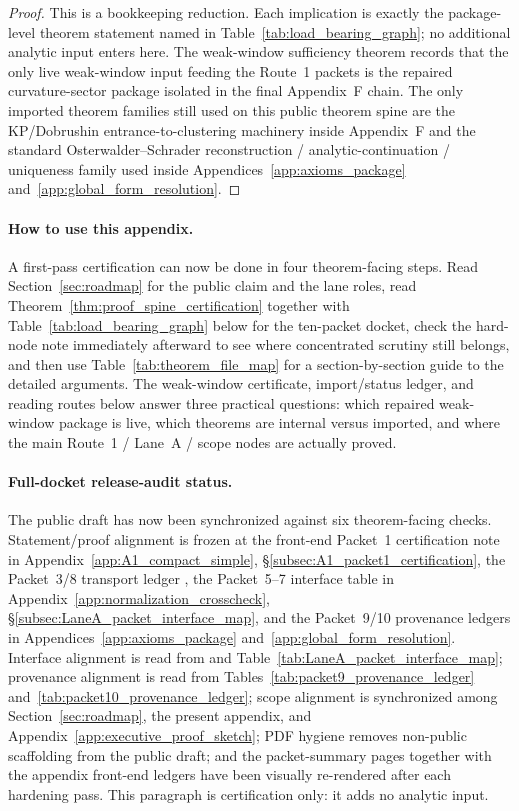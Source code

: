 \begin{proof}
This is a bookkeeping reduction.
Each implication is exactly the package-level theorem statement named in Table~\ref{tab:load_bearing_graph}; no additional analytic input enters here.
The weak-window sufficiency theorem  records that the only live weak-window input feeding the Route~1 packets is the repaired curvature-sector package isolated in the final Appendix~F chain.
The only imported theorem families still used on this public theorem spine are the KP/Dobrushin entrance-to-clustering machinery inside Appendix~F and the standard Osterwalder--Schrader reconstruction / analytic-continuation / uniqueness family used inside Appendices~\ref{app:axioms_package} and~\ref{app:global_form_resolution}.
\end{proof}

\paragraph{How to use this appendix.}
A first-pass certification can now be done in four theorem-facing steps.
Read Section~\ref{sec:roadmap} for the public claim and the lane roles, read Theorem~\ref{thm:proof_spine_certification} together with Table~\ref{tab:load_bearing_graph} below for the ten-packet docket, check the hard-node note immediately afterward to see where concentrated scrutiny still belongs, and then use Table~\ref{tab:theorem_file_map} for a section-by-section guide to the detailed arguments.
The weak-window certificate, import/status ledger, and reading routes below answer three practical questions: which repaired weak-window package is live, which theorems are internal versus imported, and where the main Route~1 / Lane~A / scope nodes are actually proved.

\paragraph{Full-docket release-audit status.}
The public draft has now been synchronized against six theorem-facing checks.
Statement/proof alignment is frozen at the front-end Packet~1 certification note in Appendix~\ref{app:A1_compact_simple}, \S\ref{subsec:A1_packet1_certification}, the Packet~3/8 transport ledger , the Packet~5--7 interface table in Appendix~\ref{app:normalization_crosscheck}, \S\ref{subsec:LaneA_packet_interface_map}, and the Packet~9/10 provenance ledgers in Appendices~\ref{app:axioms_package} and~\ref{app:global_form_resolution}.
Interface alignment is read from  and Table~\ref{tab:LaneA_packet_interface_map}; provenance alignment is read from Tables~\ref{tab:packet9_provenance_ledger} and~\ref{tab:packet10_provenance_ledger}; scope alignment is synchronized among Section~\ref{sec:roadmap}, the present appendix, and Appendix~\ref{app:executive_proof_sketch}; PDF hygiene removes non-public scaffolding from the public draft; and the packet-summary pages together with the appendix front-end ledgers have been visually re-rendered after each hardening pass.
This paragraph is certification only: it adds no analytic input.

